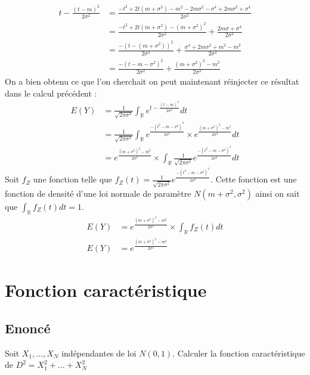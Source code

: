 \documentclass[10pt,a4paper,twoside]{article}
\begin{document}
\begin{align*}
t-\frac{(t-m)^{2}}{2\sigma^{2}} &= \frac{-t^{2}+2t(m+\sigma^{2})-m^{2}-2m\sigma^{2}-\sigma^{4}+2m\sigma^{2}+\sigma^{4}}{2\sigma^{2}}\\
&= \frac{-t^{2}+2t(m+\sigma^{2})-(m+\sigma^{2})^{2}}{2\sigma^{2}}+\frac{2m\sigma+\sigma^{4}}{2\sigma^{2}}\\
&= \frac{-(t-(m+\sigma^{2}))^{2}}{2\sigma^{2}}+\frac{\sigma^{4}+2m\sigma^{2}+m^{2}-m^{2}}{2\sigma^{2}}\\
&= \frac{-(t-m-\sigma^{2})^{2}}{2\sigma^{2}} + \frac{(m+\sigma^{2})^{2}-m^{2}}{2\sigma^{2}}
\end{align*}
On a bien obtenu ce que l'on cherchait on peut maintenant réinjecter ce résultat dans le calcul précédent :
\begin{align*}
E(Y) & = \frac{1}{\sqrt{2\pi\sigma^{2}}} \int_{\mathbb{R}} e^{t-\frac{(t-m)^{2}}{2\sigma^{2}}} dt\\
&= \frac{1}{\sqrt{2\pi\sigma^{2}}} \int_{\mathbb{R}} e^{\frac{-(t^{2}-m-\sigma^{2})^{2}}{2\sigma^{2}}} \times e^{\frac{(m+\sigma^{2})^{2}-m^{2}}{2\sigma^{2}}} dt\\
&= e^{\frac{(m+\sigma^{2})^{2}-m^{2}}{2\sigma^{2}}} \times \int_{\mathbb{R}} \frac{1}{\sqrt{2\pi\sigma^{2}}} e^{\frac{-(t^{2}-m-\sigma^{2})^{2}}{2\sigma^{2}}} dt
\end{align*}
Soit $f_{Z}$ une fonction telle que $f_{Z}(t) = \frac{1}{\sqrt{2\pi\sigma^{2}}} e^{\frac{-(t^{2}-m-\sigma^{2})^{2}}{2\sigma^{2}}}$. Cette fonction est une fonction de densité d'une loi normale de paramètre $N(m+\sigma^{2},\sigma^{2})$ ainsi on sait que $\int_{\mathbb{R}}f_{Z}(t)dt = 1$.
\begin{align*}
E(Y) &= e^{\frac{(m+\sigma^{2})^{2}-m^{2}}{2\sigma^{2}}} \times \int_{\mathbb{R}}f_{Z}(t)dt\\
E(Y) &= e^{\frac{(m+\sigma^{2})^{2}-m^{2}}{2\sigma^{2}}}
\end{align*}

\section{Fonction caractéristique}
\subsection*{Enoncé}
Soit $X_{1},\ldots,X_{N}$ indépendantes de loi $N(0,1)$. Calculer la fonction caractéristique de $D^{2}=X_{1}^{2}+\ldots+X_{N}^{2}$
\end{document}

